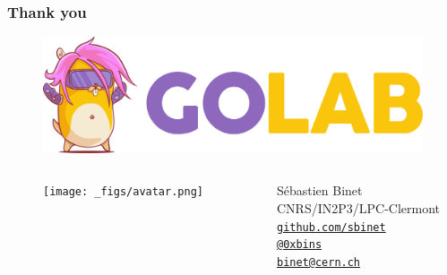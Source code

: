 \documentclass[9pt]{beamer}
\newcommand{\myblue} [1] {{\color{blue}#1}}
\begin{document}
\begin{frame}[fragile]
\frametitle{Thank you}


\begin{figure}[h]
\begin{center}
\includegraphics[width=\textwidth]{logo-golab2019.png}
\end{center}
\end{figure}

	\begin{columns}
		\begin{column}{0.7\textwidth}
			\begin{block}{}
	\begin{columns}
		\begin{column}{0.2\textwidth}
\begin{figure}[h]
\begin{center}
\texttt{[image: \_figs/avatar.png]}
\end{center}
\end{figure}
		\end{column}

		\begin{column}{0.6\textwidth}
			\begin{center}
S\'ebastien Binet\\
CNRS/IN2P3/LPC-Clermont\\
\myblue{\href{https://github.com/sbinet}{\texttt{github.com/sbinet}}}\\
\myblue{\href{https://twitter.com/0xb1ns}{\texttt{@0xbins}}}\\
\myblue{\href{mailto:binet@cern.ch}{\texttt{binet@cern.ch}}}\\
			\end{center}
		\end{column}
	\end{columns}
			\end{block}{}
		\end{column}
	\end{columns}



\end{frame}

\end{document}
